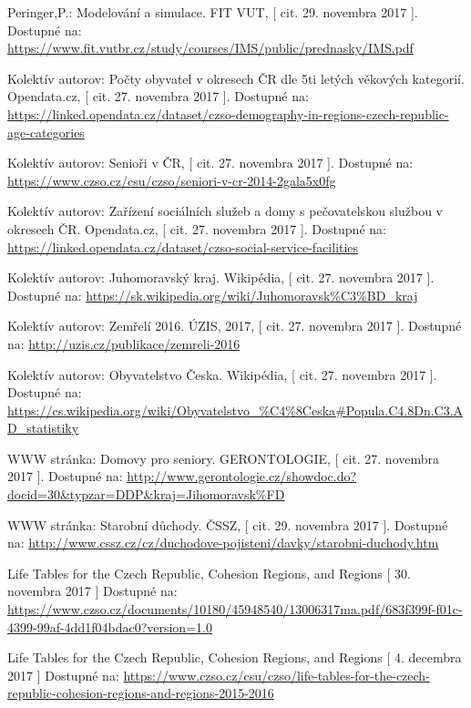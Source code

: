 \documentclass[a4paper, 11pt]{article}
\begin{document}
\newpage
\renewcommand\refname{Zdroje}
\begin{thebibliography}{9}
 Peringer,P.: Modelování a simulace. FIT VUT, [ cit. 29. novembra 2017 ]. Dostupné na: \url{https://www.fit.vutbr.cz/study/courses/IMS/public/prednasky/IMS.pdf}

 Kolektív autorov: Počty obyvatel v okresech ČR dle 5ti letých věkových kategorií. Opendata.cz, [ cit. 27. novembra 2017 ]. Dostupné na: \url{https://linked.opendata.cz/dataset/czso-demography-in-regions-czech-republic-age-categories}

 Kolektív autorov: 	Senioři v ČR, [ cit. 27. novembra 2017 ]. Dostupné na: \url{https://www.czso.cz/csu/czso/seniori-v-cr-2014-2gala5x0fg}

 Kolektív autorov: Zařízení sociálních služeb a domy s pečovatelskou službou v okresech ČR. Opendata.cz, [ cit. 27. novembra 2017 ]. Dostupné na: \url{https://linked.opendata.cz/dataset/czso-social-service-facilities}

 Kolektív autorov: Juhomoravský kraj. Wikipédia, [ cit. 27. novembra 2017 ]. Dostupné na: \url{https://sk.wikipedia.org/wiki/Juhomoravsk%C3%BD_kraj}

 Kolektív autorov: Zemřelí 2016. ÚZIS, 2017, [ cit. 27. novembra 2017 ]. Dostupné na:
\url{http://uzis.cz/publikace/zemreli-2016}

 Kolektív autorov: Obyvatelstvo Česka. Wikipédia, [ cit. 27. novembra 2017 ]. Dostupné na: \url{https://cs.wikipedia.org/wiki/Obyvatelstvo_%C4%8Ceska#Popula.C4.8Dn.C3.AD_statistiky}

 WWW stránka: Domovy pro seniory. GERONTOLOGIE, [ cit. 27. novembra 2017 ]. Dostupné na: 
\url{http://www.gerontologie.cz/showdoc.do?docid=30&typzar=DDP&kraj=Jihomoravsk%FD}

 WWW stránka: Starobní důchody. ČSSZ, [ cit. 29. novembra 2017 ]. Dostupné na: 
\url{http://www.cssz.cz/cz/duchodove-pojisteni/davky/starobni-duchody.htm}

 Life Tables for the Czech Republic, Cohesion Regions, and Regions [ 30. novembra 2017 ] Dostupné na: \url{https://www.czso.cz/documents/10180/45948540/13006317ma.pdf/683f399f-f01c-4399-99af-4dd1f04bdac0?version=1.0}

 Life Tables for the Czech Republic, Cohesion Regions, and Regions [ 4. decembra 2017 ] Dostupné na:
\url{https://www.czso.cz/csu/czso/life-tables-for-the-czech-republic-cohesion-regions-and-regions-2015-2016}


\end{thebibliography}
\end{document}
